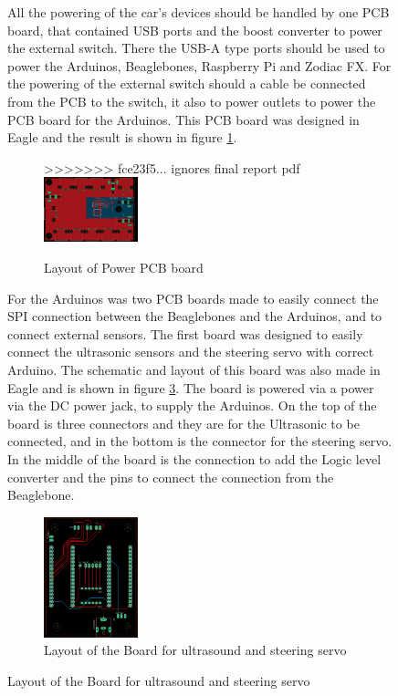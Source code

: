 \documentclass[11pt, titlepage]{article} %
\begin{document}
\begin{figure}
All the powering of the car's devices should be handled by one PCB board, that contained USB ports and the boost converter to power the external switch. There the USB-A type ports should be used to power the Arduinos, Beaglebones, Raspberry Pi and Zodiac FX. For the powering of the external switch should a cable be connected from the PCB to the switch, it also to power outlets to power the PCB board for the Arduinos. This PCB board was designed in Eagle and the result is shown in figure \ref{fig:power_pcb_layout}. 

\begin{figure}
>>>>>>> fce23f5... ignores final report pdf
	\includegraphics[width=0.3\textwidth]{power_board_layout.png}
	\label{fig:power_pcb_layout}
	\caption{Layout of Power PCB board}
\end{figure}

For the Arduinos was two PCB boards made to easily connect the SPI connection between the Beaglebones and the Arduinos, and to connect external sensors. The first board was designed to easily connect the ultrasonic sensors and the steering servo with correct Arduino. The schematic and layout of this board was also made in Eagle and is shown in figure \ref{fig:board_layout_ultra_servo}. The board is powered via a power via the DC power jack, to supply the Arduinos. On the top of the board is three connectors and they are for the Ultrasonic to be connected, and in the bottom is the connector for the steering servo. In the middle of the board is the connection to add the Logic level converter and the pins to connect the connection from the Beaglebone. 

\begin{figure}
	\includegraphics[width=0.3\textwidth]{borad_layout_seervo_ultra.png}
	\caption{Layout of the Board for ultrasound and steering servo}
	\label{fig:board_layout_ultra_servo}
\end{figure}


\end{figure}
\end{document}
